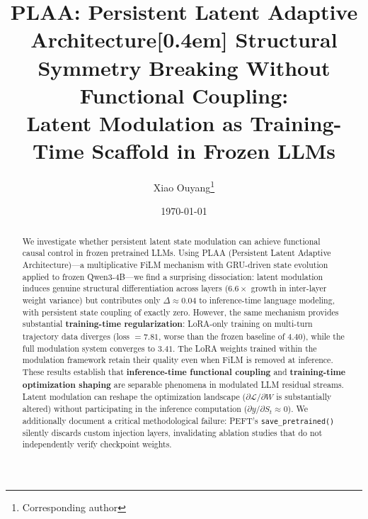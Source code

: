 \documentclass[11pt,a4paper]{article}
\title{
  \textbf{PLAA: Persistent Latent Adaptive Architecture}[0.4em] \large Structural Symmetry Breaking Without Functional Coupling:\\ \large Latent Modulation as Training-Time Scaffold in Frozen LLMs }  \author{ Xiao Ouyang\thanks{Corresponding author} }  \date{\today}
\begin{document}
  \maketitle \thispagestyle{empty}  \begin{abstract} We investigate whether persistent latent state modulation can achieve functional causal control in frozen pretrained LLMs. Using PLAA (Persistent Latent Adaptive Architecture)---a multiplicative FiLM mechanism with GRU-driven state evolution applied to frozen Qwen3-4B---we find a surprising dissociation: latent modulation induces genuine structural differentiation across layers ($6.6\times$ growth in inter-layer weight variance) but contributes only $\Delta \approx 0.04$ to inference-time language modeling, with persistent state coupling of exactly zero.  However, the same mechanism provides substantial \textbf{training-time regularization}: LoRA-only training on multi-turn trajectory data diverges (loss $= 7.81$, worse than the frozen baseline of $4.40$), while the full modulation system converges to $3.41$. The LoRA weights trained within the modulation framework retain their quality even when FiLM is removed at inference.  These results establish that \textbf{inference-time functional coupling} and \textbf{training-time optimization shaping} are separable phenomena in modulated LLM residual streams. Latent modulation can reshape the optimization landscape ($\partial \mathcal{L} / \partial W$ is substantially altered) without participating in the inference computation ($\partial y / \partial S_t \approx 0$). We additionally document a critical methodological failure: PEFT's \texttt{save\_pretrained()} silently discards custom injection layers, invalidating ablation studies that do not independently verify checkpoint weights. \end{abstract}  \newpage \setcounter{page}{1}  %
\end{document}
